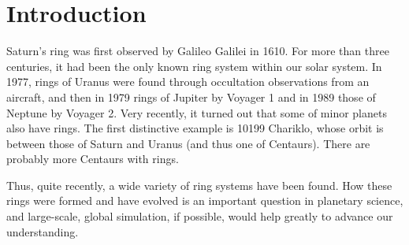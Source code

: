 \documentclass[conference]{IEEEtran}
\begin{document}



\section{Introduction}
  \label{sect:overview}


  

Saturn's ring was first observed by Galileo Galilei in 1610. For more
than three centuries, it had been the only known ring system within
our solar system. In 1977, rings of Uranus were found through
occultation observations from an aircraft, and then in 1979 rings of
Jupiter by Voyager 1 and in 1989 those of Neptune by Voyager 2.  Very
recently, it turned out that some of minor planets also have
rings. The first distinctive example is 10199 Chariklo, whose orbit is
between those of Saturn and Uranus (and thus one of Centaurs). There
are probably more Centaurs with rings.

Thus, quite recently, a wide variety of ring systems have been found.
How these rings were formed and have evolved is an important question
in planetary science, and large-scale, global simulation, if possible,
would help greatly to advance our understanding.
\end{document}
